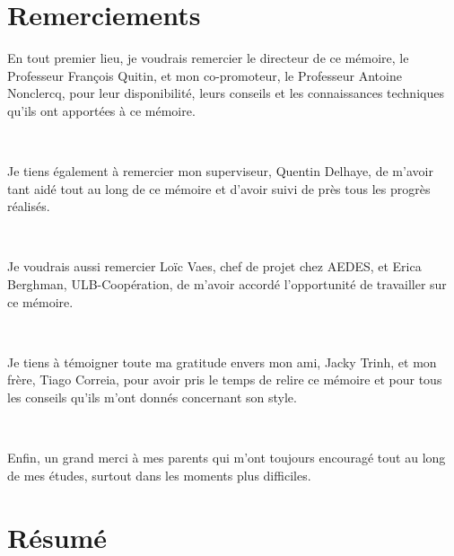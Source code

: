 \documentclass[a4paper, 12pt]{report}
\begin{document}


\chapter*{\huge Remerciements}

    \noindent
    En tout premier lieu, je voudrais remercier le directeur de ce mémoire, le Professeur François Quitin, et mon co-promoteur, le Professeur Antoine Nonclercq, pour leur disponibilité, leurs conseils et les connaissances techniques qu’ils ont apportées à ce mémoire.

    ~

    \noindent
    Je tiens également à remercier mon superviseur, Quentin Delhaye, de m’avoir tant aidé tout au long de ce mémoire et d’avoir suivi de près tous les progrès réalisés.


    ~

    \noindent
    Je voudrais aussi remercier Loïc Vaes, chef de projet chez AEDES, et Erica Berghman, ULB-Coopération, de m’avoir accordé l’opportunité de travailler sur ce mémoire.


    ~

    \noindent
    Je tiens à témoigner toute ma gratitude envers mon ami, Jacky Trinh, et mon frère, Tiago Correia, pour avoir pris le temps de relire ce mémoire et pour tous les conseils qu’ils m’ont donnés concernant son style.


    ~

    \noindent
    Enfin, un grand merci à mes parents qui m’ont toujours encouragé tout au long de mes études, surtout dans les moments plus difficiles.


\chapter*{\huge Résumé}


  \vspace{5cm}
\end{document}
